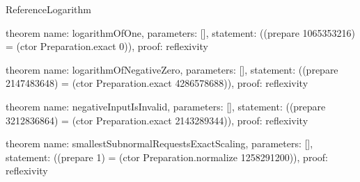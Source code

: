 \begin{lexlean}{ReferenceLogarithm}
\begin{semanticmodule}
theorem{
  name: logarithmOfOne,
  parameters: [],
  statement: ((prepare 1065353216) = (ctor Preparation.exact 0)),
  proof: reflexivity{}
}

theorem{
  name: logarithmOfNegativeZero,
  parameters: [],
  statement: ((prepare 2147483648) = (ctor Preparation.exact 4286578688)),
  proof: reflexivity{}
}

theorem{
  name: negativeInputIsInvalid,
  parameters: [],
  statement: ((prepare 3212836864) = (ctor Preparation.exact 2143289344)),
  proof: reflexivity{}
}

theorem{
  name: smallestSubnormalRequestsExactScaling,
  parameters: [],
  statement: ((prepare 1) = (ctor Preparation.normalize 1258291200)),
  proof: reflexivity{}
}
\end{semanticmodule}
\end{lexlean}
